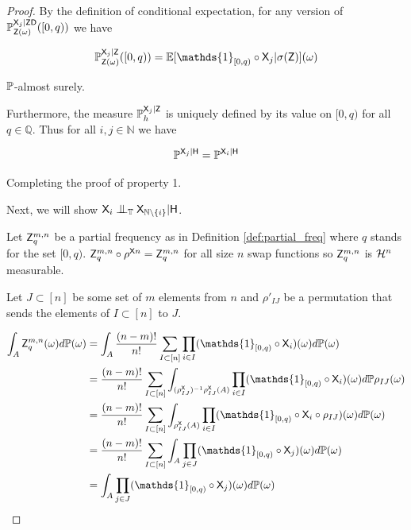 \begin{proof}
By the definition of conditional expectation, for any version of $\mathbb{P}_{\mathsf{Z}(\omega)}^{\mathsf{X}_j|\mathsf{Z}\mathsf{D}}([0,q))$ we have

\begin{align}
    \prob{P}_{\RV{Z}(\omega)}^{\RV{X}_j|\RV{Z}}([0,q)) &= \mathbb{E}[\mathds{1}_{[0,q)}\circ \RV{X}_j|\sigma(\RV{Z})](\omega)\\
\end{align}

$\mathbb{P}$-almost surely.

Furthermore, the measure $\mathbb{P}_{h}^{\mathsf{X}_j|\mathsf{Z}}$ is uniquely defined by its value on $[0,q)$ for all $q\in \mathbb{Q}$. Thus for all $i,j\in \mathbb{N}$ we have

\begin{align}
    \mathbb{P}^{\mathsf{X}_j|\mathsf{H}} = \mathbb{P}^{\mathsf{X}_i|\mathsf{H}}
\end{align}

Completing the proof of property 1.

Next, we will show $\RV{X}_i\CI_\kernel{T} \RV{X}_{\mathbb{N}\setminus \{i\}} | \RV{H}$.

Let $\mathsf{Z}^{m,n}_q$ be a partial frequency as in Definition \ref{def:partial_freq} where $q$ stands for the set $[0,q)$. $\mathsf{Z}^{m,n}_q\circ \rho^{\mathsf{X}n}=\mathsf{Z}^{m,n}_q$ for all size $n$ swap functions so $\mathsf{Z}^{m,n}_q$  is $\mathcal{H}^n$ measurable.

Let $J\subset[n]$ be some set of $m$ elements from $n$ and $\rho'_{IJ}$ be a permutation that sends the elements of $I\subset[n]$ to $J$.

\begin{align}
    \int_{A} \RV{Z}_q^{m,n} (\omega) d\prob{P}(\omega) &= \int_{A} \frac{(n-m)!}{n!}\sum_{I\subset[n]}\prod_{i\in I} (\mathds{1}_{[0,q)}\circ \RV{X}_i)(\omega)d\prob{P}(\omega)\\
    &= \frac{(n-m)!}{n!}\sum_{I\subset[n]} \int_{(\rho^{\RV{X}}_{IJ})^{-1}\rho^{\RV{X}}_{IJ}(A)} \prod_{i\in I}(\mathds{1}_{[0,q)}\circ \RV{X}_i)(\omega)d\prob{P}\rho_{IJ}(\omega)\\
    &= \frac{(n-m)!}{n!}\sum_{I\subset[n]} \int_{\rho^{\RV{X}}_{IJ}(A)} \prod_{i\in I}(\mathds{1}_{[0,q)}\circ \RV{X}_{i}\circ \rho_{IJ}) (\omega)d\prob{P}(\omega)\label{eq:using_pushforward}\\
    &= \frac{(n-m)!}{n!}\sum_{I\subset[n]} \int_{A} \prod_{j\in J}(\mathds{1}_{[0,q)}\circ \RV{X}_{j})(\omega)d\prob{P}(\omega)\label{eq:closure_under_permutation2}\\
    &= \int_{A} \prod_{j\in J}(\mathds{1}_{[0,q)} \circ \RV{X}_j)(\omega)d\prob{P}(\omega) \label{eq:cond_expectation_first2}
\end{align}


\end{proof}
